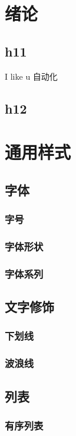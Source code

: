 \section[绪论]{绪论}
\subsection{h11}
I like u
\lipsum[1-10]
自动化
\subsection{h12}

\clearpage
\section{通用样式}
\subsection{字体}
    \subsubsection{字号}
    \subsubsection{字体形状}
    \subsubsection{字体系列}
\subsection{文字修饰}
    \subsubsection{下划线}
    \subsubsection{波浪线}
\subsection{列表}
    \subsubsection{有序列表}
